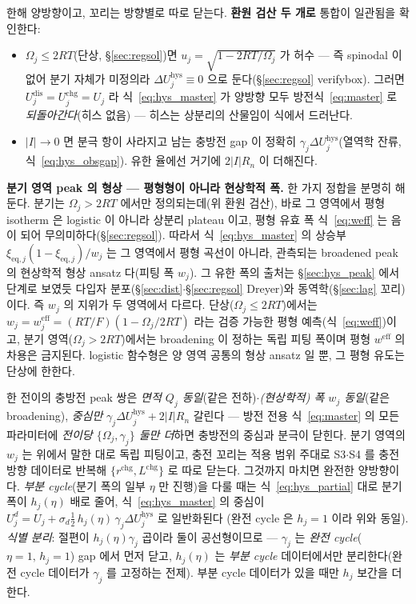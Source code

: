 \documentclass[11pt,a4paper]{article}
\newcommand{\eff}{\mathrm{eff}}
\newcommand{\eq}{\mathrm{eq}}
\newcommand{\dis}{\mathrm{dis}}
\newcommand{\chg}{\mathrm{chg}}
\newcommand{\hys}{\mathrm{hys}}
\begin{document}
한해 양방향이고, 꼬리는 방향별로 따로 닫는다.
\textbf{환원 검산 두 개로} 통합이 일관됨을 확인한다:
\begin{itemize}[leftmargin=1.4em,itemsep=2pt]
\item $\Omega_j\le2RT$(단상, \S\ref{sec:regsol})면 $u_j=\sqrt{1-2RT/\Omega_j}$ 가 허수 — 즉 spinodal 이 없어 분기
  자체가 미정의라 $\Delta U_j^\hys\equiv0$ 으로 둔다(\S\ref{sec:regsol} verifybox). 그러면 $U_j^\dis=U_j^\chg=U_j$ 라
  식~\eqref{eq:hys_master} 가 양방향 모두 방전식~\eqref{eq:master} 로 \emph{되돌아간다}(히스 없음) — 히스는 상분리의 산물임이 식에서 드러난다.
\item $|I|\to0$ 면 분극 항이 사라지고 남는 충방전 gap 이 정확히 $\gamma_j\Delta U_j^\hys$(열역학 잔류,
  식~\eqref{eq:hys_obsgap}). 유한 율에선 거기에 $2|I|R_n$ 이 더해진다.
\end{itemize}

\textbf{분기 영역 peak 의 형상 — 평형형이 아니라 현상학적 폭.} 한 가지 정합을 분명히 해 둔다. 분기는
$\Omega_j>2RT$ 에서만 정의되는데(위 환원 검산), 바로 그 영역에서 평형 isotherm 은 logistic 이 아니라 상분리
plateau 이고, 평형 유효 폭 식~\eqref{eq:weff} 는 음이 되어 무의미하다(\S\ref{sec:regsol}). 따라서
식~\eqref{eq:hys_master} 의 상승부 $\xi_{\eq,j}(1-\xi_{\eq,j})/w_j$ 는 그 영역에서 평형 곡선이 아니라, 관측되는
broadened peak 의 현상학적 형상 ansatz 다(피팅 폭 $w_j$). 그 유한 폭의 출처는 \S\ref{sec:hys_peak} 에서 단계로
보였듯 다입자 분포(\S\ref{sec:dist}$\cdot$\S\ref{sec:regsol} Dreyer)와 동역학(\S\ref{sec:lag} 꼬리)이다.
즉 $w_j$ 의 지위가 두 영역에서 다르다. 단상($\Omega_j\le2RT$)에서는 $w_j=w_j^\eff=(RT/F)(1-\Omega_j/2RT)$
라는 검증 가능한 평형 예측(식~\eqref{eq:weff})이고, 분기 영역($\Omega_j>2RT$)에서는 broadening 이 정하는 독립
피팅 폭이며 평형 $w^\eff$ 의 차용은 금지된다. logistic 함수형은 양 영역 공통의 형상 ansatz 일 뿐, 그 평형
유도는 단상에 한한다.

한 전이의 충방전 peak 쌍은 \emph{면적 $Q_j$ 동일}(같은 전하)$\cdot$\emph{(현상학적) 폭 $w_j$ 동일}(같은 broadening),
\emph{중심만} $\gamma_j\Delta U_j^\hys+2|I|R_n$ 갈린다 — 방전 전용 식~\eqref{eq:master} 의 모든 파라미터에
\emph{전이당 $\{\Omega_j,\gamma_j\}$ 둘만 더}하면 충방전의 중심과 분극이 닫힌다. 분기 영역의 $w_j$ 는
위에서 말한 대로 독립 피팅이고, 충전 꼬리는 적용 범위 주대로 S3$\cdot$S4 를 충전 방향 데이터로 반복해
$\{r^{\chg},L^{\chg}\}$ 로 따로 닫는다. 그것까지 마치면 완전한 양방향이다.
\emph{부분 cycle}(분기 폭의 일부 $\eta$ 만 진행)을 다룰 때는 식~\eqref{eq:hys_partial} 대로 분기 폭이 $h_j(\eta)$ 배로
줄어, 식~\eqref{eq:hys_master} 의 중심이 $U_j^{d}=U_j+\sigma_d\tfrac12\,h_j(\eta)\,\gamma_j\Delta U_j^\hys$ 로 일반화된다
(완전 cycle 은 $h_j=1$ 이라 위와 동일). \emph{식별 분리}: 절편이 $h_j(\eta)\gamma_j$ 곱이라 둘이 공선형이므로 — $\gamma_j$ 는
\emph{완전 cycle}($\eta=1,\,h_j=1$) gap 에서 먼저 닫고, $h_j(\eta)$ 는 \emph{부분 cycle} 데이터에서만 분리한다(완전
cycle 데이터가 $\gamma_j$ 를 고정하는 전제). 부분 cycle 데이터가 있을 때만 $h_j$ 보간을 더한다.
\end{document}
